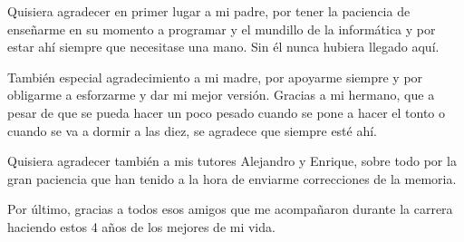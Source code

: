 \documentclass[11pt,a4paper,titlepage,oneside]{report}
\begin{document}

 
 \paxinaenbranco
 \begin{agradecementos}
 Quisiera agradecer en primer lugar a mi padre, por tener la paciencia de enseñarme en su momento a programar y el mundillo de la informática y por estar ahí siempre que necesitase una mano. Sin él nunca hubiera llegado aquí.

 También especial agradecimiento a mi madre, por apoyarme siempre y por obligarme a esforzarme y dar mi mejor versión.
 Gracias a mi hermano, que a pesar de que se pueda hacer un poco pesado cuando se pone a hacer el tonto o cuando se va a dormir a las diez, se agradece que siempre esté ahí.

 Quisiera agradecer también a mis tutores Alejandro y Enrique, sobre todo por la gran paciencia que han tenido a la hora de enviarme correcciones de la memoria.
 
 Por último, gracias a todos esos amigos que me acompañaron durante la carrera haciendo estos 4 años de los mejores de mi vida.
 \end{agradecementos}
 
 

 \setcounter{page}{1}

 \tableofcontents
 \listoffigures
 \listoftables
 \clearpage
 
 \setcounter{page}{1}


 
 
 
 
 
 
 


 \appendix
 \appendixpage
 
 
 
 

 \printglossary[type=\acronymtype,title=\nomeglosarioacronimos]
 \printglossary[title=\nomeglosariotermos]

 
 
 \clearpage
 
\end{document}
